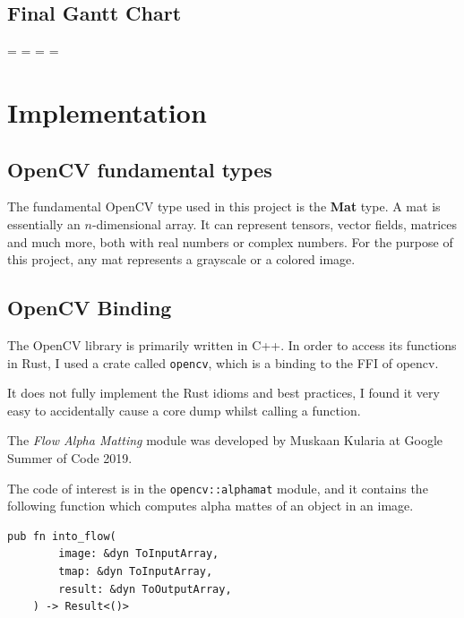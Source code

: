 \documentclass[a4paper]{article}
\begin{document}
\newpage

\subsection{Final Gantt Chart}


\endgroup
\newpage
\addtolength\headwidth{-1\mtL}


\paperwidth=\pdfpageheight
\paperheight=\pdfpagewidth
\pdfpageheight=\paperheight
\pdfpagewidth=\paperwidth

\section{Implementation}

\subsection{OpenCV fundamental types}

The fundamental OpenCV type used in this project is the
\textbf{Mat}\cite{mat} type. A mat is essentially an
\(n\)-dimensional array. It can represent tensors, vector fields,
matrices and much more, both with real numbers or complex numbers.
For the purpose of this project, any mat represents a grayscale
or a colored image.

\subsection{OpenCV Binding}

The OpenCV library is primarily written in C++.
In order to access its functions in Rust, I used a crate
called \texttt{opencv}\cite{rustopencv}, which is a binding
to the \gls{FFI} of opencv.

It does not fully implement the Rust idioms and best practices,
I found it very easy to accidentally cause a core dump
whilst calling a function.

The \textit{Flow Alpha Matting} module was developed by Muskaan Kularia
at Google Summer of Code 2019.

The code of interest is in the \texttt{opencv::alphamat} module,
and it contains the following function which computes alpha mattes of an object in an image.

\begin{lstlisting}[style=Rust, style=boxed]
    pub fn into_flow(
        image: &dyn ToInputArray,
        tmap: &dyn ToInputArray,
        result: &dyn ToOutputArray,
    ) -> Result<()>
\end{lstlisting}
\end{document}
